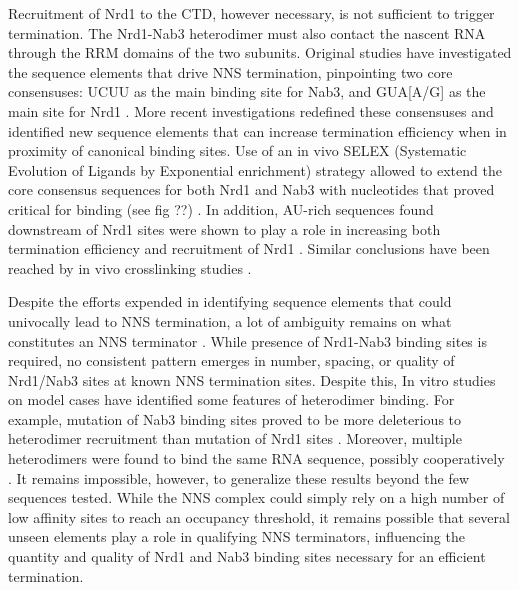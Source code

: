 Recruitment of Nrd1 to the CTD, however necessary, is not sufficient to trigger termination. 
The Nrd1-Nab3 heterodimer must also contact the nascent RNA through the RRM domains of the two subunits.
Original studies have investigated the sequence elements that drive NNS termination, pinpointing two core consensuses: UCUU as the main binding site for Nab3, and GUA[A/G] as the main site for Nrd1 \cite{carroll:2004:identification}. 
More recent investigations redefined these consensuses and identified new sequence elements that can increase termination efficiency when in proximity of canonical binding sites. 
Use of an in vivo SELEX (Systematic Evolution of Ligands by Exponential enrichment) strategy allowed to extend the core consensus sequences for both Nrd1 and Nab3 with nucleotides that proved critical for binding (see fig ??) \cite{porrua:2012:in}. 
In addition, AU-rich sequences found downstream of Nrd1 sites were shown to play a role in increasing both termination efficiency and recruitment of Nrd1 \cite{porrua:2012:in}. Similar conclusions have been reached by in vivo crosslinking studies \cite{wlotzka:2011:nuclear}.

Despite the efforts expended in identifying sequence elements that could univocally lead to NNS termination, a lot of ambiguity remains on what constitutes an NNS terminator \invivo{}. 
While presence of Nrd1-Nab3 binding sites is required, no consistent pattern emerges in number, spacing, or quality of Nrd1/Nab3 sites at known NNS termination sites. 
Despite this, In vitro studies on model cases have identified some features of heterodimer binding. 
For example, mutation of Nab3 binding sites proved to be more deleterious to heterodimer recruitment than mutation of Nrd1 sites \cite{carroll:2007:interaction}. 
Moreover, multiple heterodimers were found to bind the same RNA sequence, possibly cooperatively \cite{carroll:2007:interaction}. 
It remains impossible, however, to generalize these results beyond the few sequences tested. 
While the NNS complex could simply rely on a high number of low affinity sites to reach an occupancy threshold, it remains possible that several unseen elements play a role in qualifying NNS terminators, influencing the quantity and quality of Nrd1 and Nab3 binding sites necessary for an efficient termination.

